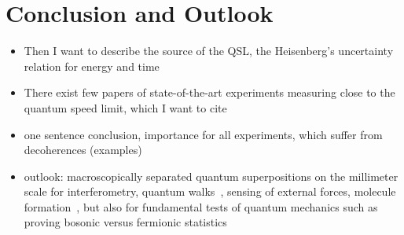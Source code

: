 \documentclass[aps,pra,reprint,a4paper,nofootinbib,superscriptaddress,numbers,longbibliography,showpacs,showkeys,floatfix]{revtex4-1}
\begin{document}
\section*{Conclusion and Outlook}
\begin{itemize}
     \item Then I want to describe the source of the QSL, the Heisenberg's uncertainty relation for energy and time~\cite{Deffner:2017a, Anandan:1990} %
    \item There exist few papers of state-of-the-art experiments measuring close to the quantum speed limit, which I want to cite~\cite{Frank:2016, Bason:2012}
    \item one sentence conclusion, importance for all experiments, which suffer from decoherences (examples)
    \item outlook: macroscopically separated quantum superpositions on the millimeter scale for interferometry, quantum walks~\cite{Groh:2016}, sensing of external forces, molecule formation~\cite{Liu:2018}, but also for fundamental tests of quantum mechanics such as proving bosonic versus fermionic statistics~\cite{Roos:2017}
\end{itemize}
\end{document}
